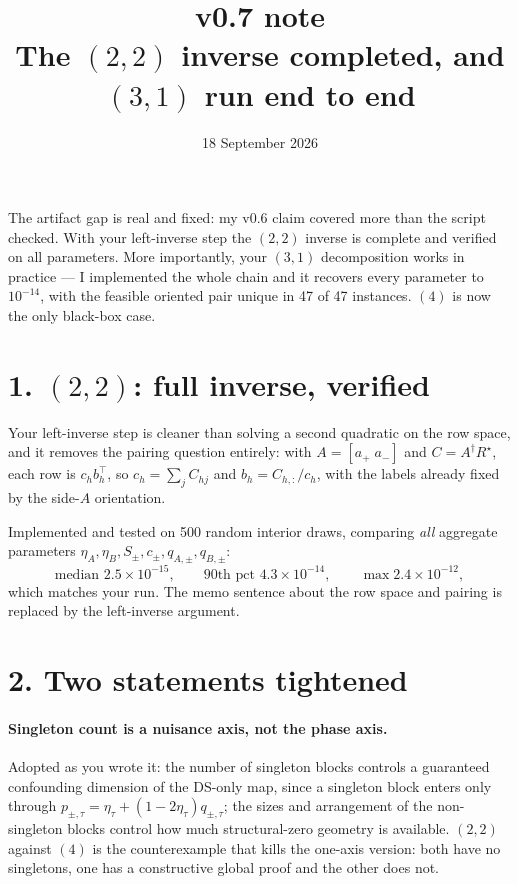 \documentclass[11pt]{article}
\title{\textbf{v0.7 note}\\[2pt]
\large The $(2,2)$ inverse completed, and $(3,1)$ run end to end}
\author{18 September 2026}
\date{}
\theoremstyle{remark}
\begin{document}
\maketitle
\vspace{-2.5em}

The artifact gap is real and fixed: my v0.6 claim covered more than the script checked. With your left-inverse step the $(2,2)$ inverse is complete and verified on all parameters. More importantly, your $(3,1)$ decomposition works in practice --- I implemented the whole chain and it recovers every parameter to $10^{-14}$, with the feasible oriented pair unique in 47 of 47 instances. $(4)$ is now the only black-box case.

\section*{1. $(2,2)$: full inverse, verified}

Your left-inverse step is cleaner than solving a second quadratic on the row space, and it removes the pairing question entirely: with $A=[a_+\;a_-]$ and $C=A^\dagger R^\star$, each row is $c_h b_h^\top$, so $c_h=\sum_j C_{hj}$ and $b_h=C_{h,:}/c_h$, with the labels already fixed by the side-$A$ orientation.

Implemented and tested on 500 random interior draws, comparing \emph{all} aggregate parameters $\eta_A,\eta_B,S_\pm,c_\pm,q_{A,\pm},q_{B,\pm}$:
\[
\text{median }2.5\times10^{-15},\qquad 90\text{th pct }4.3\times10^{-14},\qquad\max 2.4\times10^{-12},
\]
which matches your run. The memo sentence about the row space and pairing is replaced by the left-inverse argument.

\section*{2. Two statements tightened}

\paragraph{Singleton count is a nuisance axis, not the phase axis.} Adopted as you wrote it: the number of singleton blocks controls a guaranteed confounding dimension of the DS-only map, since a singleton block enters only through $p_{\pm,\tau}=\eta_\tau+(1-2\eta_\tau)q_{\pm,\tau}$; the sizes and arrangement of the non-singleton blocks control how much structural-zero geometry is available. $(2,2)$ against $(4)$ is the counterexample that kills the one-axis version: both have no singletons, one has a constructive global proof and the other does not.
\end{document}
